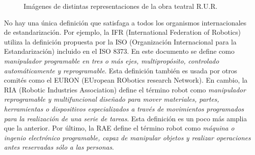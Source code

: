 \begin{figure}[hbtp]
  \centering
  \caption{Imágenes de distintas representaciones de la obra teatral R.U.R.}
  \label{fig:rur}
\end{figure}

No hay una única definición que satisfaga a todos los organismos internacionales de estandarización. Por ejemplo, la IFR (International Federation of Robotics) utiliza la definición propuesta por la ISO (Organización Internacional para la Estandarización) incluido en el ISO 8373. En este documento se define como \textit{manipulador programable en tres o más ejes, multipropósito, controlado automáticamente y reprogramable}. Esta definición también es usada por otros comités como el EURON (EUropean RObotics research Network). En cambio, la RIA (Robotic Industries Association) define el término robot como \textit{manipulador reprogramable y multifuncional diseñado para mover materiales, partes, herramientas o dispositivos especializados a través de movimientos programados para la realización de una serie de tareas}. Esta definición es un poco más amplia que la anterior. Por último, la RAE define el término robot como \textit{máquina o ingenio electrónico programable, capaz de manipular objetos y realizar operaciones antes reservadas sólo a las personas}.\\

